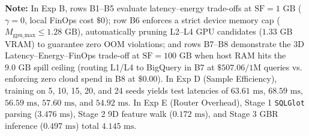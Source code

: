 \documentclass[10pt,a4paper]{article}
\begin{document}
\begin{table}[!t]
{\begin{tabular}{@{}llcccccccc@{}}
\bottomrule
\end{tabular}%
}
\vspace{2pt}
\parbox{\textwidth}{\scriptsize \textbf{Note:} In Exp B, rows B1--B5 evaluate latency--energy trade-offs at $\text{SF}=1\text{ GB}$ ($\gamma=0$, local FinOps cost $\$0$); row B6 enforces a strict device memory cap ($M_{\text{gpu\_max}} \le 1.28\text{ GB}$), automatically pruning L2--L4 GPU candidates ($1.33\text{ GB}$ VRAM) to guarantee zero OOM violations; and rows B7--B8 demonstrate the 3D Latency--Energy--FinOps trade-off at $\text{SF}=100\text{ GB}$ when host RAM hits the $9.0\text{ GB}$ spill ceiling (routing L1/L4 to BigQuery in B7 at $\$507.06/1\text{M}$ queries vs. enforcing zero cloud spend in B8 at $\$0.00$). In Exp D (Sample Efficiency), training on 5, 10, 15, 20, and 24 seeds yields test latencies of $63.61\text{ ms}$, $68.59\text{ ms}$, $56.59\text{ ms}$, $57.60\text{ ms}$, and $54.92\text{ ms}$. In Exp E (Router Overhead), Stage 1 \texttt{SQLGlot} parsing ($3.476\text{ ms}$), Stage 2 9D feature walk ($0.172\text{ ms}$), and Stage 3 GBR inference ($0.497\text{ ms}$) total $4.145\text{ ms}$.}
\end{table}
\end{document}
